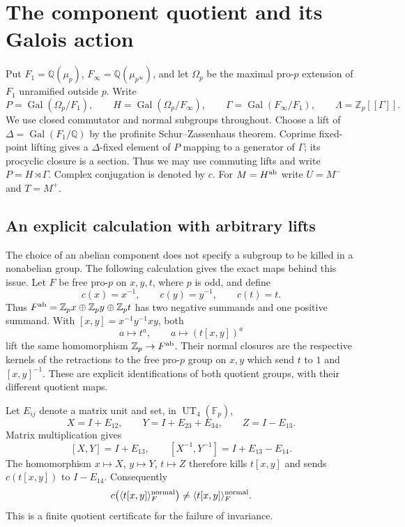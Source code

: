 
\section{The component quotient and its Galois action}
\label{sec:component-quotient-audit}

Put $F_1=\mathbb Q(\mu_p)$, $F_\infty=\mathbb Q(\mu_{p^\infty})$,
and let $\Omega_p$ be the maximal pro-$p$ extension of $F_1$
unramified outside $p$.  Write
\[
 P=\operatorname{Gal}(\Omega_p/F_1),\qquad
 H=\operatorname{Gal}(\Omega_p/F_\infty),\qquad
 \Gamma=\operatorname{Gal}(F_\infty/F_1),\qquad
 \Lambda=\mathbb Z_p[[\Gamma]].
\]
We use closed commutator and normal subgroups throughout.  Choose a
lift of $\Delta=\operatorname{Gal}(F_1/\mathbb Q)$ by the profinite
Schur--Zassenhaus theorem.  Coprime fixed-point lifting gives a
$\Delta$-fixed element of $P$ mapping to a generator of $\Gamma$;
its procyclic closure is a section.  Thus we may use commuting
lifts and write $P=H\rtimes\Gamma$.  Complex conjugation is denoted
by $c$.  For $M=H^{\rm ab}$ write $U=M^-$ and $T=M^+$.

\subsection{An explicit calculation with arbitrary lifts}

The choice of an abelian component does not specify a subgroup to be
killed in a nonabelian group.  The following calculation gives the
exact maps behind this issue.  Let $F$ be free pro-$p$ on $x,y,t$, where
$p$ is odd, and define
\[
 c(x)=x^{-1},\qquad c(y)=y^{-1},\qquad c(t)=t.
\]
Thus $F^{\rm ab}=\mathbb Z_p x\oplus\mathbb Z_p y\oplus\mathbb Z_p t$
has two negative summands and one positive summand.  With
$[x,y]=x^{-1}y^{-1}xy$, both
\[
 a\longmapsto t^a,\qquad
 a\longmapsto(t[x,y])^a
\]
lift the same homomorphism $\mathbb Z_p\to F^{\rm ab}$.
Their normal closures are the respective kernels of the retractions
to the free pro-$p$ group on $x,y$ which send $t$ to $1$ and
$[x,y]^{-1}$.  These are explicit identifications of both quotient
groups, with their different quotient maps.

Let $E_{ij}$ denote a matrix unit and set, in
$\operatorname{UT}_4(\mathbb F_p)$,
\[
 X=I+E_{12},\qquad Y=I+E_{23}+E_{34},\qquad Z=I-E_{13}.
\]
Matrix multiplication gives
\[
 [X,Y]=I+E_{13},\qquad
 [X^{-1},Y^{-1}]=I+E_{13}-E_{14}.
\]
The homomorphism $x\mapsto X$, $y\mapsto Y$, $t\mapsto Z$
therefore kills $t[x,y]$ and sends $c(t[x,y])$ to $I-E_{14}$.
Consequently
\begin{equation}\label{eq:component-raw-lift}
 c\bigl(\langle t[x,y]\rangle_F^{\rm normal}\bigr)
 \ne\langle t[x,y]\rangle_F^{\rm normal}.
\end{equation}
This is a finite quotient certificate for the failure of invariance.

